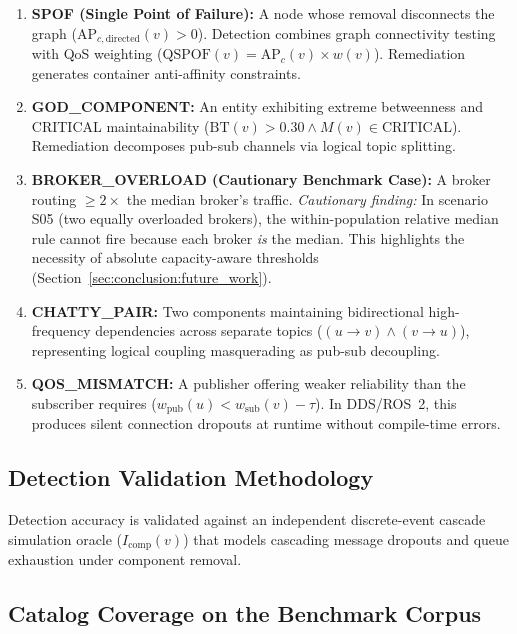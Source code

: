 \begin{enumerate}
    \item \textbf{SPOF (Single Point of Failure):} A node whose removal disconnects the graph ($\mathrm{AP}_{c,\text{directed}}(v) > 0$). Detection combines graph connectivity testing with QoS weighting ($\mathrm{QSPOF}(v) = \mathrm{AP}_c(v) \times w(v)$). Remediation generates container anti-affinity constraints.
    \item \textbf{GOD\_COMPONENT:} An entity exhibiting extreme betweenness and CRITICAL maintainability ($\mathrm{BT}(v) > 0.30 \wedge M(v) \in \text{CRITICAL}$). Remediation decomposes pub-sub channels via logical topic splitting.
    \item \textbf{BROKER\_OVERLOAD (Cautionary Benchmark Case):} A broker routing $\ge 2\times$ the median broker's traffic. \emph{Cautionary finding:} In scenario S05 (two equally overloaded brokers), the within-population relative median rule cannot fire because each broker \emph{is} the median. This highlights the necessity of absolute capacity-aware thresholds (Section~\ref{sec:conclusion:future_work}).
    \item \textbf{CHATTY\_PAIR:} Two components maintaining bidirectional high-frequency dependencies across separate topics ($(u \to v) \wedge (v \to u)$), representing logical coupling masquerading as pub-sub decoupling.
    \item \textbf{QOS\_MISMATCH:} A publisher offering weaker reliability than the subscriber requires ($w_{\text{pub}}(u) < w_{\text{sub}}(v) - \tau$). In DDS/ROS~2, this produces silent connection dropouts at runtime without compile-time errors.
\end{enumerate}

\subsection{Detection Validation Methodology}
\label{sec:catalog:validation}

Detection accuracy is validated against an independent discrete-event cascade simulation oracle ($I_{\text{comp}}(v)$) that models cascading message dropouts and queue exhaustion under component removal.

\subsection{Catalog Coverage on the Benchmark Corpus}
\label{sec:catalog:coverage}


